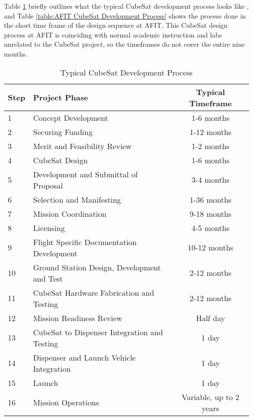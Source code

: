 Table \ref{table:CubeSat Development Process} briefly outlines what the typical CubeSat development process looks like \citep{NASA101}, and Table \ref{table:AFIT CubeSat Development Process} shows the process done in the short time frame of the design sequence at AFIT. This CubeSat design process at AFIT is coinciding with normal academic instruction and labs unrelated to the CubeSat project, so the timeframes do not cover the entire nine months. 

\begin{table}[H]
\centering
\begin{tabular}{|l|l|c|} 
 \hline
 Step & Project Phase & Typical Timeframe \\ [0.5ex] 
 \hline\hline
 1 & Concept Development & 1-6 months\\
 2 & Securing Funding & 1-12 months\\
 3 & Merit and Feasibility Review & 1-2 months\\
 4 & CubeSat Design & 1-6 months\\
 5 & Development and Submittal of Proposal & 3-4 months\\
 6 & Selection and Manifesting & 1-36 months\\
 7 & Mission Coordination & 9-18 months\\
 8 & Licensing & 4-5 months\\ 
 9 & Flight Specific Documentation Development & 10-12 months\\
 10 & Ground Station Design, Development and Test & 2-12 months\\ 
 11 & CubeSat Hardware Fabrication and Testing & 2-12 months\\
 12 & Mission Readiness Review & Half day\\
 13 & CubeSat to Dispenser Integration and Testing & 1 day\\
 14 & Dispenser and Launch Vehicle Integration & 1 day\\
 15 & Launch & 1 day\\
 16 & Mission Operations & Variable, up to 2 years\\
 \hline
\end{tabular}
\caption{Typical CubeSat Development Process}
\label{table:CubeSat Development Process}
\end{table}


